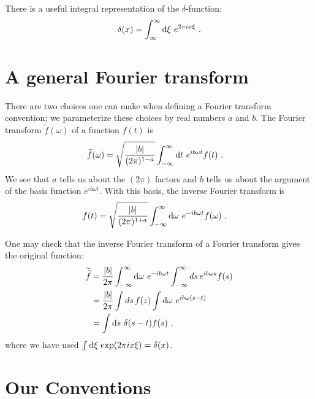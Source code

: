 \documentclass[12pt, oneside]{report}    %
\let\oldsection\section
\def\section{%
  \setcounter{sidenote}{1}%
  \oldsection
}
\begin{document}
There is a useful integral representation of the $\delta$-function:
\begin{align}
    \delta(x) = \int_{\infty}^\infty \operatorname{d}\mkern-3mu^{}\mkern-1mu{\xi}\,\,  e^{2\pi i x\xi} \ .
    \label{eq:delta:func:integral:rep}
\end{align}




\section{A general Fourier transform}

There are two choices one can make when defining a Fourier transform convention; we parameterize these choices by real numbers $a$ and $b$. The Fourier transform $\tilde f(\omega)$ of a function $f(t)$ is
\begin{align}
  \widetilde f(\omega)
  &= 
  \sqrt{\frac{|b|}{(2\pi)^{1-a}}}
  \int_{-\infty}^\infty \operatorname{d}\mkern-3mu^{}\mkern-1mu{t}\,\, e^{ib\omega t} f(t) \ .
\end{align}
We see that $a$ tells us about the $(2\pi)$ factors and $b$ tells us about the argument of the basis function $e^{ib\omega t}$. With this basis, the inverse Fourier transform is 
\begin{align}
  f(t)&=
  \sqrt{\frac{|b|}{(2\pi)^{1+a}}}
  \int_{-\infty}^\infty \operatorname{d}\mkern-3mu^{}\mkern-1mu{\omega}\,\, e^{-ib\omega t} f(\omega) \ .
\end{align}

One may check that the inverse Fourier transform of a Fourier transform gives the original function:
\begin{align}
  \widetilde{\widetilde f} &=
  \frac{|b|}{2\pi}
  \int_{-\infty}^\infty \operatorname{d}\mkern-3mu^{}\mkern-1mu{\omega}\,\, e^{-ib\omega t}
  \int_{-\infty}^{\infty}
  ds\, e^{ib\omega s} f(s)
  \\
  &= 
  \frac{|b|}{2\pi}
  \int ds\, f(z) \int \operatorname{d}\mkern-3mu^{}\mkern-1mu{\omega}\, \, e^{ib\omega(s-t)}
  \\
  &= \int \operatorname{d}\mkern-3mu^{}\mkern-1mu{s}\,\, \delta(s-t) f(s) \ ,
\end{align}
where we have used $\int \operatorname{d}\mkern-3mu^{}\mkern-1mu{\xi}\, \exp(2\pi i x\xi) = \delta(x)$. 



\section{Our Conventions}
\end{document}
